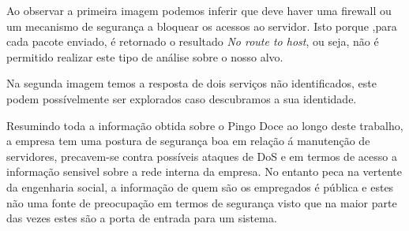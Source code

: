 \par Ao observar a primeira imagem podemos inferir que deve haver uma firewall ou um mecanismo de segurança a bloquear os acessos ao servidor. Isto porque ,para cada pacote enviado, é retornado o resultado \textit{No route to host}, ou seja, não é permitido realizar este tipo de análise sobre o nosso alvo.\newline
\par Na segunda imagem temos a resposta de dois serviços não identificados, este podem possívelmente ser explorados caso descubramos a sua identidade.\newline
\par Resumindo toda a informação obtida sobre o Pingo Doce ao longo deste trabalho, a empresa tem uma postura de segurança boa em relação á manutenção de servidores, precavem-se contra possíveis ataques de DoS e em termos de acesso a informação sensivel sobre a rede interna da empresa. No entanto peca na vertente da engenharia social, a informação de quem são os empregados é pública e estes não uma fonte de preocupação em termos de segurança visto que na maior parte das vezes estes são a porta de entrada para um sistema. 

